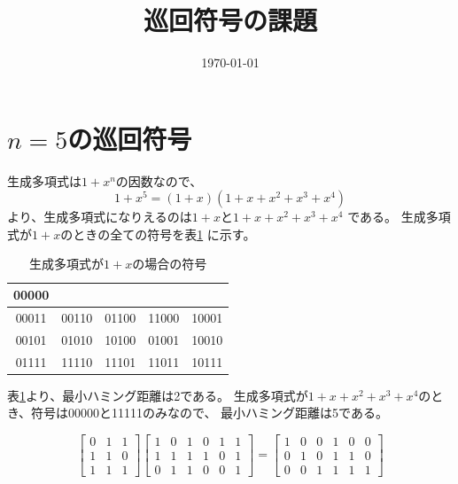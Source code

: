 \documentclass[a4paper,11pt]{jsarticle}
\begin{document}
\title{巡回符号の課題}
\author{}
\date{\today}
\maketitle


\section{$n=5$の巡回符号}
生成多項式は$1+x^n$の因数なので、
\[
  1+x^5=(1+x)(1+x+x^2+x^3+x^4)
\]
より、生成多項式になりえるのは$1+x$と$1+x+x^2+x^3+x^4$
である。
生成多項式が$1+x$のときの全ての符号を表\ref{table:n5g1}
に示す。
\begin{table}[hbtp]
  \caption{生成多項式が$1+x$の場合の符号}
  \label{table:n5g1}
  \centering
  \begin{tabular}{ccccc}
    00000 &&&& \\ \hline
    00011 & 00110 & 01100 & 11000 & 10001 \\ \hline
    00101 & 01010 & 10100 & 01001 & 10010 \\ \hline
    01111 & 11110 & 11101 & 11011 & 10111
  \end{tabular}
\end{table}
表\ref{table:n5g1}より、最小ハミング距離は2である。
生成多項式が$1+x+x^2+x^3+x^4$のとき、符号は00000と11111のみなので、
最小ハミング距離は5である。

\begin{equation*}
  \begin{bmatrix}
    0 & 1 & 1 \\
    1 & 1 & 0 \\
    1 & 1 & 1
  \end{bmatrix}
  \begin{bmatrix}
    1 & 0 & 1 & 0 & 1 & 1 \\
    1 & 1 & 1 & 1 & 0 & 1 \\
    0 & 1 & 1 & 0 & 0 & 1
  \end{bmatrix}=
  \begin{bmatrix}
    1 & 0 & 0 & 1 & 0 & 0 \\
    0 & 1 & 0 & 1 & 1 & 0 \\
    0 & 0 & 1 & 1 & 1 & 1
  \end{bmatrix}
\end{equation*}
\end{document}
